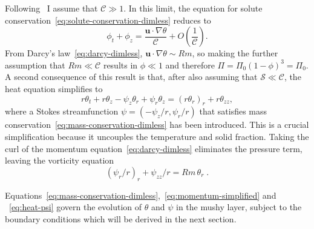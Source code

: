 \documentclass[11pt]{proc}
\newcommand{\St}{\mathscr{S}}
\newcommand{\CompRatio}{\mathscr{C}}
\begin{document}
Following~\citet*{rees-jones-worster-13} I assume that $\CompRatio \gg 1$. In this limit, the equation for solute conservation~\eqref{eq:solute-conservation-dimless} reduces to
\begin{equation}
\phi_t + \phi_z = \frac{ \mathbf{u} \cdot \nabla \theta}{\CompRatio} + O\left(\frac{1}{\CompRatio}\right).
\end{equation}
From Darcy's law~\eqref{eq:darcy-dimless}, $\mathbf{u} \cdot \nabla \theta \sim Rm$, so making the further assumption that $Rm \ll \CompRatio$ results in $\phi \ll 1$ and therefore $\Pi = \Pi_0(1-\phi)^3 = \Pi_0$. A second consequence of this result is that, after also assuming that $\St \ll \CompRatio$, the heat equation simplifies to
\begin{equation}
\label{eq:heat-psi}
r \theta_t + r \theta_z - \psi_z \theta_r + \psi_r \theta_z = (r \theta_r)_r + r \theta_{zz},
\end{equation}
where a Stokes streamfunction $\psi = (-\psi_z/r, \psi_r/r)$ that satisfies mass conservation~\eqref{eq:mass-conservation-dimless} has been introduced. This is a crucial simplification because it uncouples the temperature and solid fraction. Taking the curl of the momentum equation~\eqref{eq:darcy-dimless} eliminates the pressure term, leaving the vorticity equation
\begin{equation}
\label{eq:momentum-simplified}
(\psi_r/r)_r + \psi_{zz}/r = Rm \, \theta_r \; .
\end{equation}

Equations~\eqref{eq:mass-conservation-dimless},~\eqref{eq:momentum-simplified} and ~\eqref{eq:heat-psi} govern the evolution of $\theta$ and $\psi$ in the mushy layer, subject to the boundary conditions which will be derived in the next section.
\end{document}

